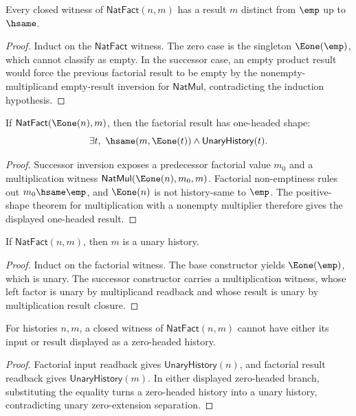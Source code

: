 \begin{lemma}
\label{lem:nat-fact-result-not-empty}
Every closed witness of $\mathsf{NatFact}(n,m)$ has a result $m$ distinct
from $\emp$ up to $\hsame$.
\end{lemma}
\begin{proof}
Induct on the $\mathsf{NatFact}$ witness. The zero case is the singleton
$\Eone(\emp)$, which cannot classify as empty. In the successor case, an empty
product result would force the previous factorial result to be empty by the
nonempty-multiplicand empty-result inversion for $\mathsf{NatMul}$, contradicting
the induction hypothesis.
\end{proof}

\begin{lemma}
\label{thm:natfact-successor-result-positive-shape}
If $\mathsf{NatFact}(\Eone(n),m)$, then the factorial result has one-headed
shape:
$$
\exists t,\ \hsame(m,\Eone(t))\wedge\mathsf{UnaryHistory}(t).
$$
\end{lemma}
\begin{proof}
Successor inversion exposes a predecessor factorial value $m_0$ and a
multiplication witness $\mathsf{NatMul}(\Eone(n),m_0,m)$. Factorial
non-emptiness rules out $m_0\hsame\emp$, and $\Eone(n)$ is not history-same to
$\emp$. The positive-shape theorem for multiplication with a nonempty
multiplier therefore gives the displayed one-headed result.
\end{proof}

\begin{lemma}
\label{lem:natfact-result-unary}
If \(\mathsf{NatFact}(n,m)\), then \(m\) is a unary history.
\end{lemma}
\begin{proof}
Induct on the factorial witness. The base constructor yields \(\Eone(\emp)\), which is unary. The successor constructor carries a multiplication witness, whose left factor is unary by multiplicand readback and whose result is unary by multiplication result closure.
\end{proof}

\begin{theorem}
\label{thm:natfact-zero-headed-component-absurd}
For histories \(n,m\), a closed witness of \(\mathsf{NatFact}(n,m)\) cannot
have either its input or result displayed as a zero-headed history.
\end{theorem}
\begin{proof}
Factorial input readback gives \(\mathsf{UnaryHistory}(n)\), and factorial
result readback gives \(\mathsf{UnaryHistory}(m)\). In either displayed
zero-headed branch, substituting the equality turns a zero-headed history into
a unary history, contradicting unary zero-extension separation.
\end{proof}

